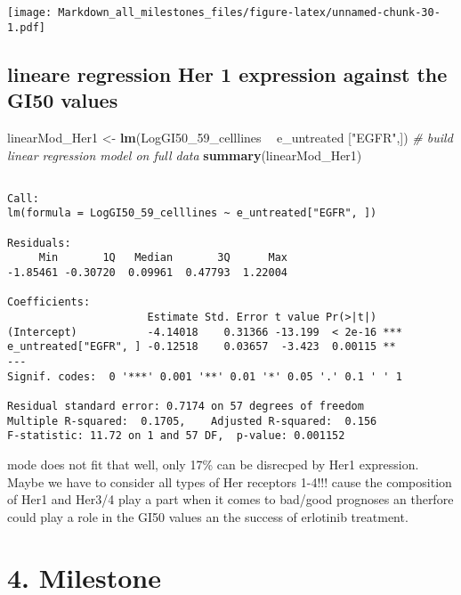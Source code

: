 \documentclass[]{article}
\newenvironment{Shaded}{\begin{snugshade}}{\end{snugshade}}
\newcommand{\CommentTok}[1]{\textcolor[rgb]{0.56,0.35,0.01}{\textit{#1}}}
\newcommand{\DecValTok}[1]{\textcolor[rgb]{0.00,0.00,0.81}{#1}}
\newcommand{\KeywordTok}[1]{\textcolor[rgb]{0.13,0.29,0.53}{\textbf{#1}}}
\newcommand{\NormalTok}[1]{#1}
\newcommand{\OperatorTok}[1]{\textcolor[rgb]{0.81,0.36,0.00}{\textbf{#1}}}
\newcommand{\StringTok}[1]{\textcolor[rgb]{0.31,0.60,0.02}{#1}}
\begin{document}
\texttt{[image: Markdown\_all\_milestones\_files/figure-latex/unnamed-chunk-30-1.pdf]}

\hypertarget{lineare-regression-her-1-expression-against-the-gi50-values}{%
\subsection{lineare regression Her 1 expression against the GI50
values}\label{lineare-regression-her-1-expression-against-the-gi50-values}}

\begin{Shaded}
\begin{Highlighting}[]
\NormalTok{linearMod_Her1 <-}\StringTok{ }\KeywordTok{lm}\NormalTok{(LogGI50_}\DecValTok{59}\NormalTok{_celllines }\OperatorTok{~}\StringTok{ }\NormalTok{e_untreated [}\StringTok{"EGFR"}\NormalTok{,])  }\CommentTok{# build linear regression model on full data}
\KeywordTok{summary}\NormalTok{(linearMod_Her1)}
\end{Highlighting}
\end{Shaded}

\begin{verbatim}

Call:
lm(formula = LogGI50_59_celllines ~ e_untreated["EGFR", ])

Residuals:
     Min       1Q   Median       3Q      Max 
-1.85461 -0.30720  0.09961  0.47793  1.22004 

Coefficients:
                      Estimate Std. Error t value Pr(>|t|)    
(Intercept)           -4.14018    0.31366 -13.199  < 2e-16 ***
e_untreated["EGFR", ] -0.12518    0.03657  -3.423  0.00115 ** 
---
Signif. codes:  0 '***' 0.001 '**' 0.01 '*' 0.05 '.' 0.1 ' ' 1

Residual standard error: 0.7174 on 57 degrees of freedom
Multiple R-squared:  0.1705,    Adjusted R-squared:  0.156 
F-statistic: 11.72 on 1 and 57 DF,  p-value: 0.001152
\end{verbatim}

mode does not fit that well, only 17\% can be disrecped by Her1
expression. Maybe we have to consider all types of Her receptors 1-4!!!
cause the composition of Her1 and Her3/4 play a part when it comes to
bad/good prognoses an therfore could play a role in the GI50 values an
the success of erlotinib treatment.

\hypertarget{milestone}{%
\section{4. Milestone}\label{milestone}}
\end{document}
